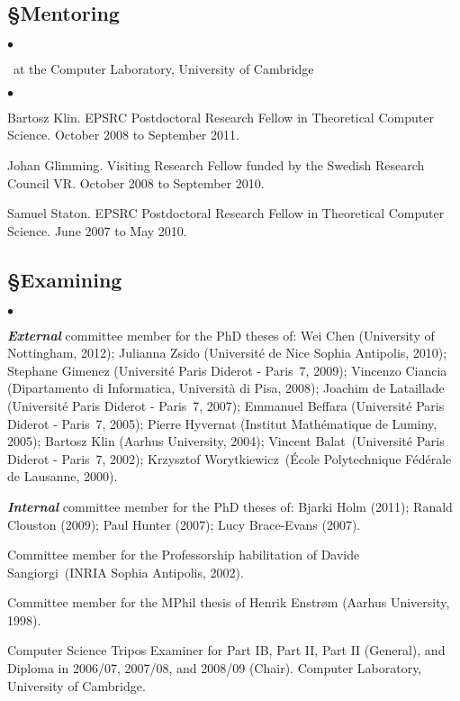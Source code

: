 \documentclass[11pt,twocolumn]{article}
\newenvironment{myitemize}
  {\begin{list}{$\bullet$}
  {\setlength{\topsep}{1pt}
   \setlength{\partopsep}{1pt}
   \setlength{\itemsep}{0pt}
   \setlength{\parsep}{0pt}
   \setlength{\leftmargin}{1em}
   \setlength{\labelwidth}{.5em}}}
  {\end{list}}
\begin{document}
\subsection*{\S\enspace\thinspace Mentoring}
\vspace*{-2mm}
\begin{myitemize}
\item[]\small\ at the Computer Laboratory, University of Cambridge
\end{myitemize}

\begin{myitemize}
\item
Bartosz Klin.  EPSRC Postdoctoral Research Fellow in Theoretical Computer
Science.  October 2008 to September 2011.  

\item
Johan Glimming.  Visiting Research Fellow funded by the Swedish Research
Council VR.  October 2008 to September 2010.  

\item
Samuel Staton.  EPSRC Postdoctoral Research Fellow in Theoretical Computer
Science.  June 2007 to May 2010.  
\end{myitemize}

\subsection*{\S\enspace\thinspace Examining}

\begin{myitemize}
\item
\textbf{\em External} committee member for the PhD theses of: 
%
Wei Chen (University of Nottingham, 2012);
%
Julianna Zsido (Universit\'e de Nice Sophia Antipolis, 2010); 
%
Stephane Gimenez (Universit\'e Paris Diderot - Paris~7, 2009); 
%
Vincenzo Ciancia (Dipartamento di Informatica, Universit\`a di Pisa,
2008); 
%
Joachim de Lataillade (Universit\'e Paris Diderot - Paris~7, 2007); 
%
Emmanuel Beffara (Universit\'e Paris Diderot - Paris~7, 2005); 
%
Pierre Hyvernat (Institut Math\'ematique de Luminy, 2005);
%
Bartosz Klin (Aarhus University, 2004);
%
Vincent Balat~(Universit\'e Paris Diderot - Paris~7, 2002);
%
Krzysztof Worytkiewicz~(\'Ecole Polytechnique F\'ed\'erale de Lausanne,
2000).

\item
\textbf{\em Internal} committee member for the PhD theses of: 
%
Bjarki Holm (2011); 
%
Ranald Clouston (2009); 
%
Paul Hunter (2007); 
%
Lucy Brace-Evans (2007).

\item
Committee member for the Professorship habilitation of
%
Davide Sangiorgi~(INRIA Sophia Antipolis, 2002).

\item
Committee member for the MPhil thesis of
%
Henrik Enstr{\o}m (Aarhus University, 1998).

\item
Computer Science Tripos Examiner for Part IB, Part II, Part II (General),
and Diploma in 2006/07, 2007/08, and 2008/09 (Chair).  
\pagebreak
Computer Laboratory, University of Cambridge.  
\end{myitemize}
\end{document}
